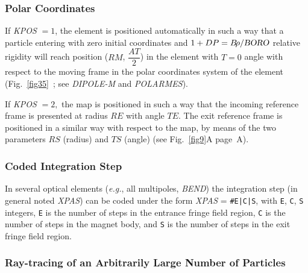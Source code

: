 {\begin{figure}[h]
\vfill
\end{figure}


\medskip





\clearpage 

 \subsubsection*{Polar Coordinates}    
 
 If  \textsl{KPOS} $=1$,  the element is positioned automatically in such a way
that a particle entering with zero initial coordinates and 
$ 1+DP=B\!\rho /\textsl{BORO} $ 
relative rigidity will reach position ($ RM$, $\dfrac{AT }{ 2} $) in 
the element with $ T=0 $ angle with respect to the moving frame in the polar 
coordinates system of the element (Fig.~\ref{fig35}~; 
see \textsl{DIPOLE-M} and \textsl{POLARMES}).

\noindent If  \textsl{KPOS} $=2, $ the map is positioned in such a way that the 
incoming reference frame is presented  at radius $ RE $ with angle $ TE $.  
The exit reference frame  is positioned in a similar way with 
respect to the map,  by means of 
the two parameters $ RS $ (radius) and $ TS $ (angle) (see Fig.~\ref{fig9}A page~\pageref{fig9}A).  






 \subsubsection{Coded Integration Step} 

In several optical elements (\emph{e.g.}, all multipoles, \textsl{BEND}) the 
integration step (in general noted \textsl{XPAS}) can be coded under the 
form \textsl{XPAS} = \texttt{\#E|C|S}, with \texttt{E}, \texttt{C}, \texttt{S} integers, \texttt{E} is the number of
steps  in the entrance fringe field region, \texttt{C} is the number of
steps in the magnet body, and \texttt{S} is the number of steps in the 
exit fringe field region.

\subsubsection{Ray-tracing of an Arbitrarily Large Number of Particles}  
  \label{sec4.6.4}

}
